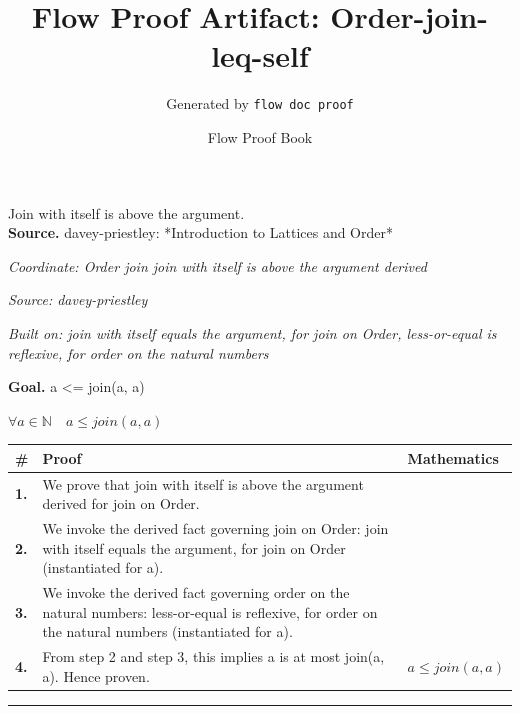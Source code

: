 \documentclass[11pt]{article}
\title{Flow Proof Artifact: Order-join-leq-self}
\author{Generated by \texttt{flow doc proof}}
\date{Flow Proof Book}
\theoremstyle{definition}
\begin{document}
\maketitle
Join with itself is above the argument.\\[0.5em]
\textbf{Source.} davey-priestley: *Introduction to Lattices and Order*\\[0.5em]
\bigskip
{}\par
\smallskip\noindent\textit{Coordinate: Order \cdot join \cdot join with itself is above the argument derived}\par
\smallskip\noindent\textit{Source: davey-priestley}\par
\smallskip\noindent\textit{Built on: join with itself equals the argument, for join on Order, less-or-equal is reflexive, for order on the natural numbers}\par
\medskip
\noindent\textbf{Goal.} a <= join(a, a)\par
\noindent$\displaystyle \forall a \in \mathbb{N}\quad a \le join(a, a)$\par
\medskip
\noindent
\begin{tabular}{@{} >{\raggedright\arraybackslash}p{} >{\raggedright\arraybackslash}p{} >{\raggedleft\arraybackslash}p{} @{}}
\textbf{\#} & \textbf{Proof} & \textbf{Mathematics} \\
\midrule
\textbf{1.} & We prove that join with itself is above the argument derived for join on Order. & \\[0.45em]
\textbf{2.} & We invoke the derived fact governing join on Order: join with itself equals the argument, for join on Order (instantiated for a). & \\[0.45em]
\textbf{3.} & We invoke the derived fact governing order on the natural numbers: less-or-equal is reflexive, for order on the natural numbers (instantiated for a). & \\[0.45em]
\textbf{4.} & From step 2 and step 3, this implies a is at most join(a, a). Hence proven. & $\displaystyle a \le join(a, a)$ \\[0.45em]
\bottomrule
\end{tabular}
\label{thm:Order-join-join_with_itself_is_above_the_argument_derived}
\par\medskip\hrule
\end{document}
